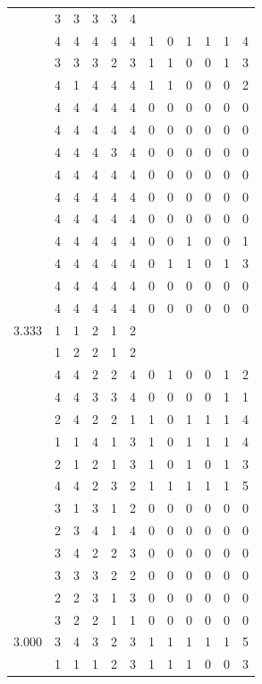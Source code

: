 \documentclass[]{msu-thesis}
\theoremstyle{definition}
\theoremstyle{definition}
\theoremstyle{definition}
\theoremstyle{remark}
\begin{document}
\begin{table}
{\begin{tabular}[t]{rrrrrrrrrrrr}
 & 3 & 3 & 3 & 3 & 4 &  &  &  &  &  & \\
 & 4 & 4 & 4 & 4 & 4 & 1 & 0 & 1 & 1 & 1 & 4\\
 & 3 & 3 & 3 & 2 & 3 & 1 & 1 & 0 & 0 & 1 & 3\\
 & 4 & 1 & 4 & 4 & 4 & 1 & 1 & 0 & 0 & 0 & 2\\
 & 4 & 4 & 4 & 4 & 4 & 0 & 0 & 0 & 0 & 0 & 0\\
 & 4 & 4 & 4 & 4 & 4 & 0 & 0 & 0 & 0 & 0 & 0\\
 & 4 & 4 & 4 & 3 & 4 & 0 & 0 & 0 & 0 & 0 & 0\\
 & 4 & 4 & 4 & 4 & 4 & 0 & 0 & 0 & 0 & 0 & 0\\
 & 4 & 4 & 4 & 4 & 4 & 0 & 0 & 0 & 0 & 0 & 0\\
 & 4 & 4 & 4 & 4 & 4 & 0 & 0 & 0 & 0 & 0 & 0\\
 & 4 & 4 & 4 & 4 & 4 & 0 & 0 & 1 & 0 & 0 & 1\\
 & 4 & 4 & 4 & 4 & 4 & 0 & 1 & 1 & 0 & 1 & 3\\
 & 4 & 4 & 4 & 4 & 4 & 0 & 0 & 0 & 0 & 0 & 0\\
 & 4 & 4 & 4 & 4 & 4 & 0 & 0 & 0 & 0 & 0 & 0\\
3.333 & 1 & 1 & 2 & 1 & 2 &  &  &  &  &  & \\
 & 1 & 2 & 2 & 1 & 2 &  &  &  &  &  & \\
 & 4 & 4 & 2 & 2 & 4 & 0 & 1 & 0 & 0 & 1 & 2\\
 & 4 & 4 & 3 & 3 & 4 & 0 & 0 & 0 & 0 & 1 & 1\\
 & 2 & 4 & 2 & 2 & 1 & 1 & 0 & 1 & 1 & 1 & 4\\
 & 1 & 1 & 4 & 1 & 3 & 1 & 0 & 1 & 1 & 1 & 4\\
 & 2 & 1 & 2 & 1 & 3 & 1 & 0 & 1 & 0 & 1 & 3\\
 & 4 & 4 & 2 & 3 & 2 & 1 & 1 & 1 & 1 & 1 & 5\\
 & 3 & 1 & 3 & 1 & 2 & 0 & 0 & 0 & 0 & 0 & 0\\
 & 2 & 3 & 4 & 1 & 4 & 0 & 0 & 0 & 0 & 0 & 0\\
 & 3 & 4 & 2 & 2 & 3 & 0 & 0 & 0 & 0 & 0 & 0\\
 & 3 & 3 & 3 & 2 & 2 & 0 & 0 & 0 & 0 & 0 & 0\\
 & 2 & 2 & 3 & 1 & 3 & 0 & 0 & 0 & 0 & 0 & 0\\
 & 3 & 2 & 2 & 1 & 1 & 0 & 0 & 0 & 0 & 0 & 0\\
3.000 & 3 & 4 & 3 & 2 & 3 & 1 & 1 & 1 & 1 & 1 & 5\\
 & 1 & 1 & 1 & 2 & 3 & 1 & 1 & 1 & 0 & 0 & 3\\

\end{tabular}}
\end{table}
\end{document}
